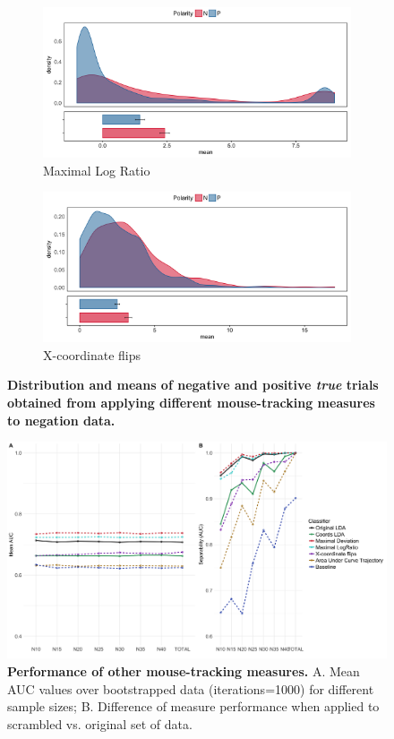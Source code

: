 \documentclass[draft]{article}
\begin{document}
\begin{figure}
%
\begin{subfigure}[b]{0.4\textwidth}
\includegraphics[width=\textwidth]{MaxRatio_negation.png}
\caption{Maximal Log Ratio}
\end{subfigure}
%
\begin{subfigure}[b]{0.4\textwidth}
\includegraphics[width=\textwidth]{Xflips_negation.png}
\caption{X-coordinate flips}
\end{subfigure}

\caption{\textbf{Distribution and means of negative and positive \emph{true} trials obtained from applying different mouse-tracking measures to negation data.}}
\label{fig:different.measures_negation}
\end{figure}

\begin{figure}
\centering
\includegraphics[width=\textwidth]{auc_permutation_negation_2.png}
\caption{\textbf{Performance of other mouse-tracking measures.} A. Mean AUC values over bootstrapped data (iterations=1000) for different sample sizes;  B. Difference of measure performance when applied to scrambled vs. original set of data.}

\label{fig:permutation_AUC_negation_measures}
\end{figure}
\end{document}
